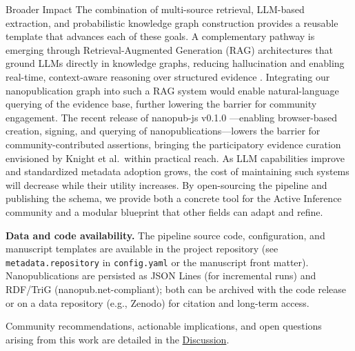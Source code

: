 \documentclass[
  ignorenonframetext,
]{beamer}
\begin{document}
\begin{frame}{Broader Impact}
The combination of multi-source retrieval, LLM-based extraction, and
probabilistic knowledge graph construction provides a reusable template
that advances each of these goals. A complementary pathway is emerging
through Retrieval-Augmented Generation (RAG) architectures that ground
LLMs directly in knowledge graphs, reducing hallucination and enabling
real-time, context-aware reasoning over structured evidence
\citep{fan2024survey}. Integrating our nanopublication graph into such a
RAG system would enable natural-language querying of the evidence base,
further lowering the barrier for community engagement. The recent
release of nanopub-js v0.1.0 \citep{kuhn2026nanopubjs}---enabling
browser-based creation, signing, and querying of
nanopublications---lowers the barrier for community-contributed
assertions, bringing the participatory evidence curation envisioned by
Knight et al.~within practical reach. As LLM capabilities improve and
standardized metadata adoption grows, the cost of maintaining such
systems will decrease while their utility increases. By open-sourcing
the pipeline and publishing the schema, we provide both a concrete tool
for the Active Inference community and a modular blueprint that other
fields can adapt and refine.

\textbf{Data and code availability.} The pipeline source code,
configuration, and manuscript templates are available in the project
repository (see \texttt{metadata.repository} in \texttt{config.yaml} or
the manuscript front matter). Nanopublications are persisted as JSON
Lines (for incremental runs) and RDF/TriG (nanopub.net-compliant); both
can be archived with the code release or on a data repository (e.g.,
Zenodo) for citation and long-term access.

Community recommendations, actionable implications, and open questions
arising from this work are detailed in the
\hyperref[sec:discussion]{Discussion}.
\end{frame}
\end{document}
